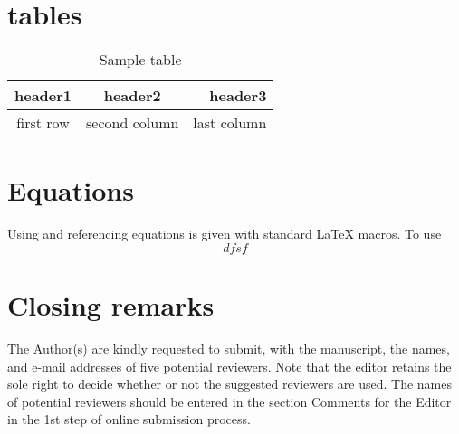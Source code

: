 \documentclass{rog}
\begin{document}
  \section{tables}
    \begin{table}
      \caption{Sample table}
    \begin{tabular}{ccr}
      \toprule
      header1 & header2 & header3 \\
      \midrule
      first row & second column & last column\\
      \bottomrule
    \end{tabular}
  \end{table}

  \section{Equations}
    Using and referencing equations 
    is given with standard \LaTeX{} macros.
    To use
    \begin{equation}
      dfsf
    \end{equation}

    
  \section{Closing remarks}
    The Author(s) are kindly requested to submit, with the manuscript, 
    the names, and e-mail addresses of five potential reviewers. Note 
    that the editor retains the sole right to decide whether or not the 
    suggested reviewers are used. The names of potential reviewers should 
    be entered in the section Comments for the Editor in the 1st step of 
    online submission process.


    
\end{document}
